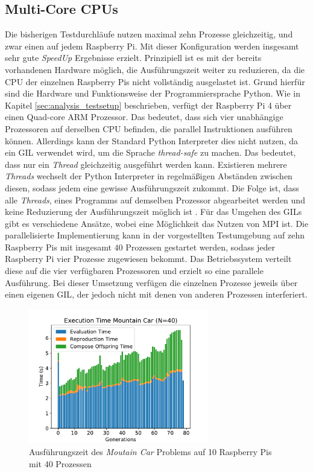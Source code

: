 \subsection{Multi-Core CPUs}
Die bisherigen Testdurchläufe nutzen maximal zehn Prozesse gleichzeitig, und zwar einen auf jedem Raspberry Pi. Mit dieser Konfiguration werden insgesamt sehr gute \emph{SpeedUp} Ergebnisse erzielt. Prinzipiell ist es mit der bereits vorhandenen Hardware möglich, die Ausführungszeit weiter zu reduzieren, da die \ac{CPU} der einzelnen Raspberry Pis nicht vollständig ausgelastet ist. Grund hierfür sind die Hardware und Funktionsweise der Programmiersprache Python. Wie in Kapitel \ref{sec:analysis_testsetup} beschrieben, verfügt der Raspberry Pi 4 über einen Quad-core ARM Prozessor. Das bedeutet, dass sich vier unabhängige Prozessoren auf derselben \ac{CPU} befinden, die parallel Instruktionen ausführen können. Allerdings kann der Standard Python Interpreter dies nicht nutzen, da ein \ac{GIL} verwendet wird, um die Sprache \emph{thread-safe} zu machen. Das bedeutet, dass nur ein \emph{Thread} gleichzeitig ausgeführt werden kann. Existieren mehrere \emph{Threads} wechselt der Python Interpreter in regelmäßigen Abständen zwischen diesen, sodass jedem eine gewisse Ausführungszeit zukommt. Die Folge ist, dass alle \emph{Threads}, eines Programms auf demselben Prozessor abgearbeitet werden und keine Reduzierung der Ausführungszeit möglich ist \cite{marowka2018python}. Für das Umgehen des \acp{GIL} gibt es verschiedene Ansätze, wobei eine Möglichkeit das Nutzen von \ac{MPI} ist. Die parallelisierte Implementierung kann in der vorgestellten Testumgebung auf zehn Raspberry Pis mit insgesamt $40$ Prozessen gestartet werden, sodass jeder Raspberry Pi vier Prozesse zugewiesen bekommt. Das Betriebssystem verteilt diese auf die vier verfügbaren Prozessoren und erzielt so eine parallele Ausführung. Bei dieser Umsetzung verfügen die einzelnen Prozesse jeweils über einen eigenen \ac{GIL}, der jedoch nicht mit denen von anderen Prozessen interferiert.
\begin{figure}[!h]
	\centering
	\includegraphics[width=0.7\textwidth]{./img/mountain_car_analysis/1413_time_40core_10pi.pdf} 
	\caption{Ausführungszeit des \emph{Moutain Car} Problems auf 10 Raspberry Pis mit 40 Prozessen}
	\label{fig:mountain_car_time_40core_10pi}
\end{figure}

